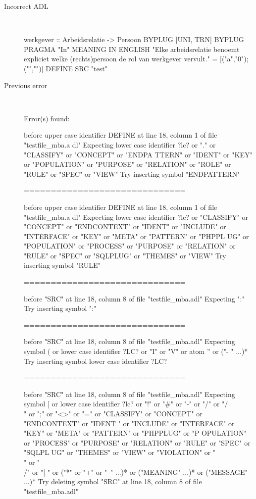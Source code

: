 \hrulefill

\begin{description}
  \item[Incorrect ADL]~\\
\begin{adl}
werkgever :: Arbeidsrelatie -> Persoon 
BYPLUG [UNI, TRN] BYPLUG
PRAGMA "In"
MEANING IN ENGLISH "Elke arbeidsrelatie benoemt expliciet welke (rechts)persoon de rol van werkgever vervult."
= [("a","0");("","")]
DEFINE SRC "test"\end{adl}
  \item[Previous error]~\\
\begin{haskell}
Error(s) found:

before upper case identifier DEFINE at line 18, column 1 of file "testfile_mba.a
dl"
Expecting lower case identifier ?lc? or "." or "CLASSIFY" or "CONCEPT" or "ENDPA
TTERN" or "IDENT" or "KEY" or "POPULATION" or "PURPOSE" or "RELATION" or "ROLE"
or "RULE" or "SPEC" or "VIEW"
Try inserting symbol "ENDPATTERN"

==============================

before upper case identifier DEFINE at line 18, column 1 of file "testfile_mba.a
dl"
Expecting lower case identifier ?lc? or "CLASSIFY" or "CONCEPT" or "ENDCONTEXT"
or "IDENT" or "INCLUDE" or "INTERFACE" or "KEY" or "META" or "PATTERN" or "PHPPL
UG" or "POPULATION" or "PROCESS" or "PURPOSE" or "RELATION" or "RULE" or "SPEC"
or "SQLPLUG" or "THEMES" or "VIEW"
Try inserting symbol "RULE"

==============================

before "SRC" at line 18, column 8 of file "testfile_mba.adl"
Expecting ":"
Try inserting symbol ":"

==============================

before "SRC" at line 18, column 8 of file "testfile_mba.adl"
Expecting symbol ( or lower case identifier ?LC? or "I" or "V" or atom '' or ("-
" ...)*
Try inserting symbol lower case identifier ?LC?

==============================

before "SRC" at line 18, column 8 of file "testfile_mba.adl"
Expecting symbol [ or lower case identifier ?lc? or "!" or "#" or "-" or "/" or
"/\\" or ";" or "<>" or "=" or "CLASSIFY" or "CONCEPT" or "ENDCONTEXT" or "IDENT
" or "INCLUDE" or "INTERFACE" or "KEY" or "META" or "PATTERN" or "PHPPLUG" or "P
OPULATION" or "PROCESS" or "PURPOSE" or "RELATION" or "RULE" or "SPEC" or "SQLPL
UG" or "THEMES" or "VIEW" or "VIOLATION" or "\\" or "\\/" or "|-" or ("*" or "+"
 or "~" ...)* or ("MEANING" ...)* or ("MESSAGE" ...)*
Try deleting symbol "SRC" at line 18, column 8 of file "testfile_mba.adl"


\end{haskell}
\end{description}
